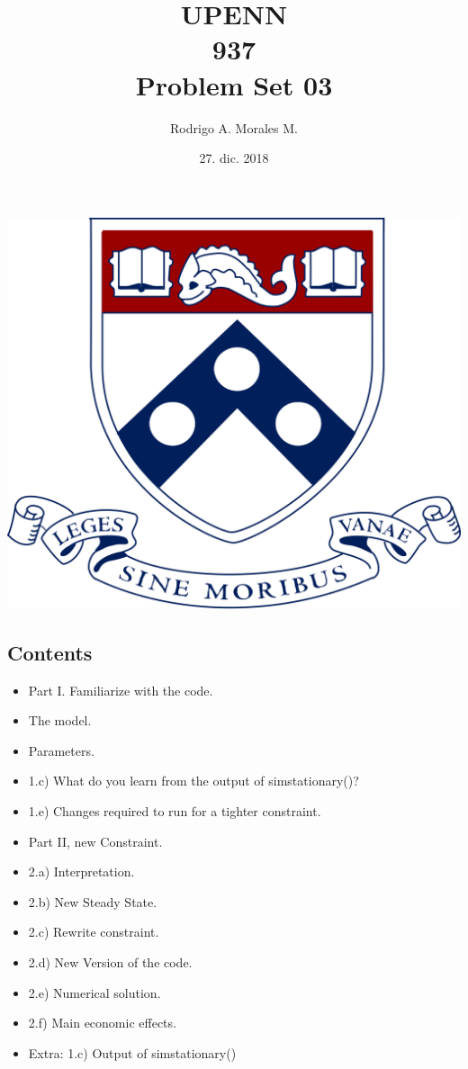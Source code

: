 \documentclass{article}
\title{UPENN \\937 \\ Problem Set 03\\ }
\author{Rodrigo A. Morales M.}
\date{27. dic. 2018}
\begin{document}
\maketitle

\begin{center}
   \includegraphics[scale=0.05]{logo1.png}
\end{center}

    
    
\subsection*{Contents}



\begin{itemize}
\setlength{\itemsep}{-1ex}
   \item Part I. Familiarize with the code.
   \item The model.
   \item Parameters.
   \item 1.c) What do you learn from the output of sim\textunderscore stationary()?
   \item 1.e) Changes required to run for a tighter constraint.
   \item Part II, new Constraint.
   \item 2.a) Interpretation.
   \item 2.b) New Steady State.
   \item 2.c) Rewrite constraint.
   \item 2.d) New Version of the code.
   \item 2.e) Numerical solution.
   \item 2.f) Main economic effects.
   \item Extra: 1.c) Output of sim\textunderscore stationary()
\end{itemize}
\end{document}
